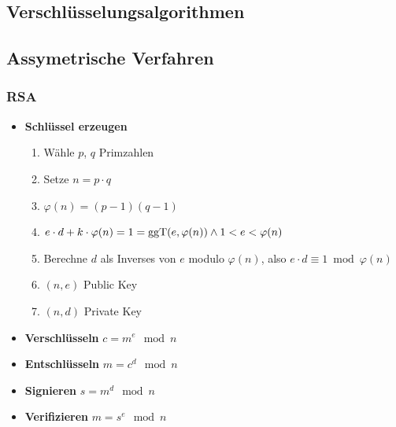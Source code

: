 \documentclass[8pt,a4paper,landscape]{article}
\begin{document}
\begin{multicols}{4}
\section{Verschlüsselungsalgorithmen}
\subsection{Assymetrische Verfahren}
\subsubsection{RSA}

\begin{itemize}[itemsep=2pt, leftmargin=0pt] 
\item[] \textbf{Schlüssel erzeugen} \begin{enumerate}[itemsep=1pt] 
    \item Wähle $p$, $q$ Primzahlen
    \item Setze $n = p \cdot q$
    \item $\varphi(n) = (p-1)(q-1)$
    \item $e \cdot d + k \cdot \varphi(n) = 1 = \operatorname {ggT}(e, \varphi(n)) \land \\ 1<e<\varphi(n)$
    \item Berechne $d$ als Inverses von $e$ modulo $\varphi(n)$, also 
          $e \cdot d \equiv 1 \bmod \varphi(n)$
    \item $(n,e)$ Public Key
    \item $(n,d)$ Private Key
\end{enumerate}
\item[] \textbf{Verschlüsseln} $c = m^{e} \mod n$ 
\item[] \textbf{Entschlüsseln} $m = c^{d} \mod n$
\item[] \textbf{Signieren} $s = m^d \mod n$
\item[] \textbf{Verifizieren} $m = s^e \mod n$
\end{itemize}


\end{multicols}
\end{document}
